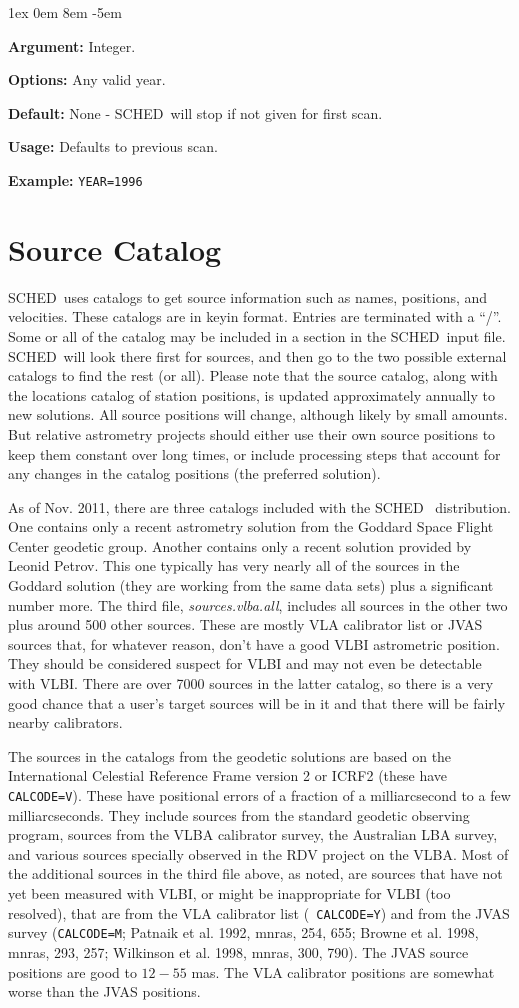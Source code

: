 \documentclass{report}
\newcommand{\sched}{{\sc SCHED}}
\newcommand{\schedb}{{\sc SCHED~}}
\newcommand{\rcwbox}[5]{
  \begin{list}{}{\parsep 1ex  \itemsep 0em
                 \leftmargin 8em  \itemindent -5em }
    \item {\bf Argument:} #1
    \item {\bf Options:}  #2
    \item {\bf Default:}  #3
    \item {\bf Usage:}    #4
    \item {\bf Example:}  #5
  \end{list}
}
\begin{document}
\rcwbox
{Integer.}
{Any valid year.}
{None - \schedb will stop if not given for first scan.}
{Defaults to previous scan.}
{{\tt YEAR=1996}}



\section{\label{SEC:SRCCAT}Source Catalog}

\schedb uses catalogs to get source information such as names,
positions, and velocities.  These catalogs are in keyin
format. Entries are terminated with a ``/''.  Some or all of the
catalog may be included in a section in the \sched\ input file.
\sched\ will look there first for sources, and then go to the two
possible external catalogs to find the rest (or all).  Please note 
that the source catalog, along with the locations catalog of station
positions, is updated approximately annually to new solutions.  
All source positions will change, although likely by small amounts.
But relative astrometry projects should either use their own 
source positions to keep them constant over long times, or include
processing steps that account for any changes in the catalog positions
(the preferred solution).

As of Nov. 2011, there are three catalogs included with the \schedb
distribution.  One contains only a recent astrometry solution from the
Goddard Space Flight Center geodetic group.  Another contains only a
recent solution provided by Leonid Petrov.  This one typically has
very nearly all of the sources in the Goddard solution (they are
working from the same data sets) plus a significant number more.  The
third file, {\sl sources.vlba.all}, includes all sources in the other
two plus around 500 other sources.  These are mostly VLA calibrator
list or JVAS sources that, for whatever reason, don't have a good VLBI
astrometric position.  They should be considered suspect for VLBI and
may not even be detectable with VLBI.  There are over 7000 sources in
the latter catalog, so there is a very good chance that a user's
target sources will be in it and that there will be fairly nearby
calibrators.

The sources in the catalogs from the geodetic solutions are based on
the International Celestial Reference Frame version 2 or ICRF2 (these
have {\tt CALCODE=V}).  These have positional errors of a fraction of
a milliarcsecond to a few milliarcseconds.  They include sources from
the standard geodetic observing program, sources from the VLBA
calibrator survey, the Australian LBA survey, and various sources
specially observed in the RDV project on the VLBA.  Most of the
additional sources in the third file above, as noted, are sources that
have not yet been measured with VLBI, or might be inappropriate for
VLBI (too resolved), that are from the VLA calibrator list ({\tt
CALCODE=Y}) and from the JVAS survey ({\tt CALCODE=M}; Patnaik et
al. 1992, mnras, 254, 655; Browne et al. 1998, mnras, 293, 257;
Wilkinson et al. 1998, mnras, 300, 790).  The JVAS source positions
are good to $12-55$ mas.  The VLA calibrator positions are somewhat
worse than the JVAS positions.
\end{document}
